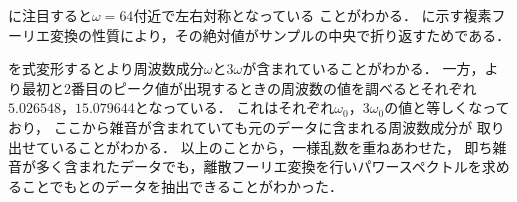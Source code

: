 \documentclass[a4j, 10pt, titlepage]{jsarticle}
\begin{document}
{に注目すると$\omega = 64$付近で左右対称となっている
ことがわかる．
に示す複素フーリエ変換の性質により，その絶対値がサンプルの中央で折り返すためである．

を式変形するとより周波数成分$\omega$と$3\omega$が含まれていることがわかる．
一方，より最初と2番目のピーク値が出現するときの周波数の値を調べるとそれぞれ$5.026548$，$15.079644$となっている．
これはそれぞれ$\omega_0$，$3\omega_0$の値と等しくなっており，
ここから雑音が含まれていても元のデータに含まれる周波数成分が
取り出せていることがわかる．
以上のことから，一様乱数を重ねあわせた，
即ち雑音が多く含まれたデータでも，離散フーリエ変換を行いパワースペクトルを求めることでもとのデータを抽出できることがわかった．
}
\end{document}
